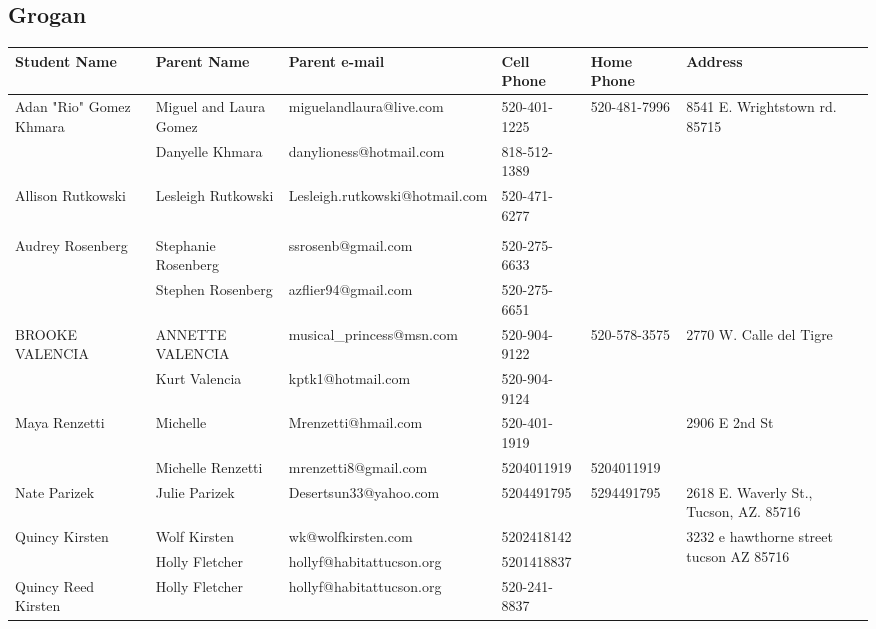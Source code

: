 \documentclass[landscape]{article}\usepackage[]{graphicx}\usepackage[]{color}
\begin{document}
\subsection{Grogan}
\begin{longtable}{|p{100pt}|p{100pt}|p{140pt}|p{60pt}|p{64pt}|p{120pt}|}
\textbf{Student Name} & \textbf{Parent Name} & \textbf{Parent e-mail} & \textbf{Cell Phone} & \textbf{Home Phone} & \textbf{Address}\\
\hline
\hline
\multirow{2}{100pt}{Adan "Rio" Gomez Khmara} & Miguel and Laura Gomez & miguelandlaura@live.com & 520-401-1225 & 520-481-7996 & \multirow{2}{120pt}{8541 E. Wrightstown rd. 85715} \\
 & Danyelle Khmara & danylioness@hotmail.com & 818-512-1389 &  & \\
\hline
\multirow{2}{100pt}{Allison Rutkowski} & Lesleigh Rutkowski  & Lesleigh.rutkowski@hotmail.com & 520-471-6277 &  & \multirow{2}{120pt}{} \\
 &  &  &  &  & \\
\hline
\multirow{2}{100pt}{Audrey Rosenberg} & Stephanie Rosenberg & ssrosenb@gmail.com & 520-275-6633 &  & \multirow{2}{120pt}{} \\
 & Stephen Rosenberg & azflier94@gmail.com & 520-275-6651 &  & \\
\hline
\multirow{2}{100pt}{BROOKE VALENCIA} & ANNETTE VALENCIA & musical\_princess@msn.com & 520-904-9122 & 520-578-3575 & \multirow{2}{120pt}{2770 W. Calle del Tigre} \\
 & Kurt Valencia & kptk1@hotmail.com & 520-904-9124 &  & \\
\hline
\multirow{2}{100pt}{Maya Renzetti} & Michelle  & Mrenzetti@hmail.com & 520-401-1919 &  & \multirow{2}{120pt}{2906 E 2nd St} \\
 & Michelle Renzetti & mrenzetti8@gmail.com & 5204011919 & 5204011919 & \\
\hline
\multirow{2}{100pt}{Nate Parizek} & Julie Parizek & Desertsun33@yahoo.com & 5204491795 & 5294491795 & \multirow{2}{120pt}{2618 E. Waverly St., Tucson, AZ. 85716} \\
 &  &  &  &  & \\
\hline
\multirow{2}{100pt}{Quincy Kirsten} & Wolf Kirsten & wk@wolfkirsten.com & 5202418142 &  & \multirow{2}{120pt}{3232 e hawthorne street tucson AZ 85716} \\
 & Holly Fletcher  & hollyf@habitattucson.org & 5201418837 &  & \\
\hline
\multirow{2}{100pt}{Quincy Reed Kirsten} & Holly Fletcher & hollyf@habitattucson.org & 520-241-8837 &  & \multirow{2}{120pt}{} \\

\end{longtable}
\end{document}
